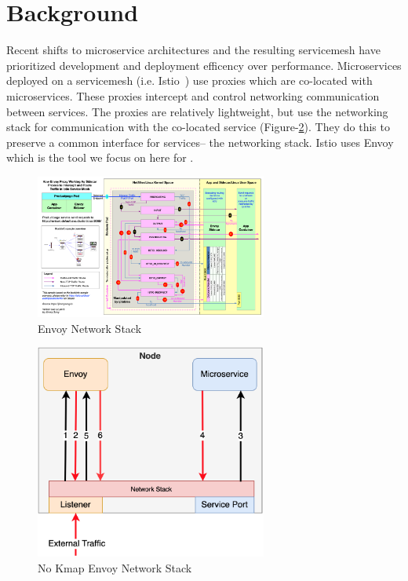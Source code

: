 \section{Background}
\label{sec:background}
Recent shifts to microservice architectures and the resulting servicemesh have prioritized development and deployment efficency over performance.
Microservices deployed on a servicemesh (i.e. Istio~\cite{istio}) use proxies which are co-located with microservices.
These proxies intercept and control networking communication between services.
The proxies are relatively lightweight, but use the networking stack for communication with the co-located service (Figure-\ref{fig:no_kmap}).
They do this to preserve a common interface for services-- the networking stack.
Istio uses Envoy~\cite{envoy} which is the tool we focus on here for \sysname.
\begin{figure}[!htb]
    \begin{minipage}{0.5\textwidth}
        \centering
        \includegraphics[keepaspectratio=true,width=3in]{figures/background/envoy.png}
        \caption{Envoy Network Stack~\cite{envoy_image}}
        \label{fig:envoy}
    \end{minipage}%
\end{figure}

\begin{figure}[!htb]
    \begin{minipage}{0.5\textwidth}
        \centering
        \includegraphics[keepaspectratio=true,width=3in]{figures/design/no_kmap.png}
        \caption{No Kmap Envoy Network Stack}
        \label{fig:no_kmap}
    \end{minipage}%
\end{figure}


